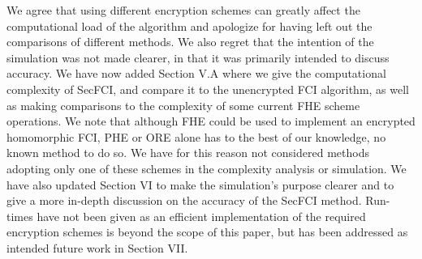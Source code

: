 \documentclass[a4paper]{scrartcl}
\newenvironment{rebuttal}{\begin{enumerate}[label={\color{grey}\thesection.\arabic{enumi}},leftmargin=0pt,ref=\thesection.\arabic{enumi}]}{\end{enumerate}}
\begin{document}
\begin{rebuttal}
We agree that using different encryption schemes can greatly affect the computational load of the algorithm and apologize for having left out the comparisons of different methods. We also regret that the intention of the simulation was not made clearer, in that it was primarily intended to discuss accuracy. We have now added Section V.A where we give the computational complexity of SecFCI, and compare it to the unencrypted FCI algorithm, as well as making comparisons to the complexity of some current FHE scheme operations. We note that although FHE could be used to implement an encrypted homomorphic FCI, PHE or ORE alone has to the best of our knowledge, no known method to do so. We have for this reason not considered methods adopting only one of these schemes in the complexity analysis or simulation. We have also updated Section VI to make the simulation's purpose clearer and to give a more in-depth discussion on the accuracy of the SecFCI method. Run-times have not been given as an efficient implementation of the required encryption schemes is beyond the scope of this paper, but has been addressed as intended future work in Section VII.


\end{rebuttal}

\end{document}
